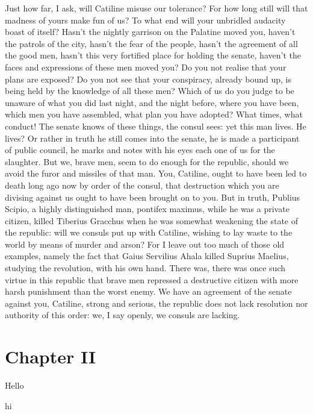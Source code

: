 \documentclass[a4paper]{article}
\begin{document}
\begin{pairs}
\begin{Leftside}
    \pend
    \endnumbering
  \end{Leftside}
  \begin{Rightside}
    \beginnumbering
    \pstart
    Just how far, I ask, will Catiline misuse our tolerance? For how long still will that madness of yours make fun of us? To what end will your unbridled audacity boast of itself? Hasn’t the nightly garrison on the Palatine moved you, haven’t the patrols of the city, hasn’t the fear of the people, hasn’t the agreement of all the good men, hasn’t this very fortified place for holding the senate, haven’t the faces and expressions of these men moved you? Do you not realise that your plans are exposed? Do you not see that your conspiracy, already bound up, is being held by the knowledge of all these men? Which of us do you judge to be unaware of what you did last night, and the night before, where you have been, which men you have assembled, what plan you have adopted?
    \pend
    \pstart
    What times, what conduct! The senate knows of these things, the consul sees: yet this man lives. He lives? Or rather in truth he still comes into the senate, he is made a participant of public council, he marks and notes with his eyes each one of us for the slaughter. But we, brave men, seem to do enough for the republic, should we avoid the furor and missiles of that man. You, Catiline, ought to have been led to death long ago now by order of the consul, that destruction which you are divising against us ought to have been brought on to you.
    \pend
    \pstart
    But in truth, Publius Scipio, a highly distinguished man, pontifex maximus, while he was a private citizen, killed Tiberius Gracchus when he was somewhat weakening the state of the republic: will we consuls put up with Catiline, wishing to lay waste to the world by means of murder and arson? For I leave out too much of those old examples, namely the fact that Gaius Servilius Ahala killed Suprius Maelius, studying the revolution, with his own hand. There was, there was once such virtue in this republic that brave men repressed a destructive citizen with more harsh punishment than the worst enemy. We have an agreement of the senate against you, Catiline, strong and serious, the republic does not lack resolution nor authority of this order: we, I say openly, we consuls are lacking.
    \pend
    \endnumbering
  \end{Rightside}
\end{pairs}
\Columns
\newpage
\section{Chapter II}
\begin{pairs}
  \begin{Leftside}
    \beginnumbering
    \pstart
    Hello
    \pend
    \endnumbering
  \end{Leftside}
  \begin{Rightside}
    \beginnumbering
    \pstart
    hi
    \pend
    \endnumbering
  \end{Rightside}
\end{pairs}
\Columns
\end{document}
